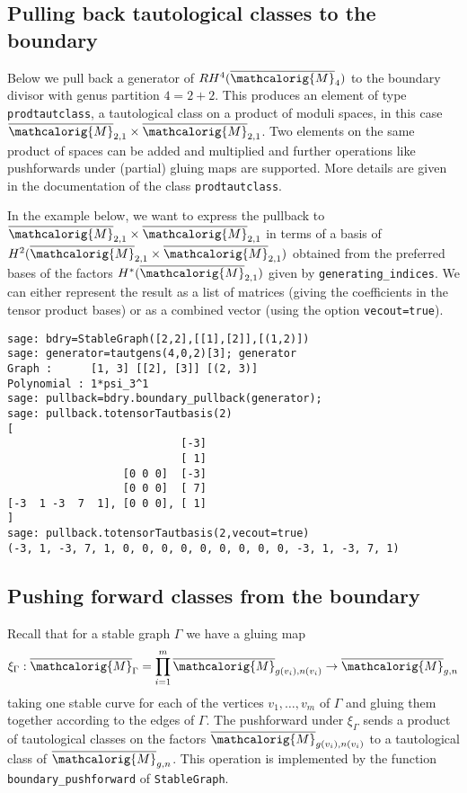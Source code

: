 \documentclass[11pt]{article}
\newcommand{\M}{\ensuremath{\overline{\mathcalorig{M}}}}
\begin{document}
\subsection{Pulling back tautological classes to the boundary} \label{Sect:tautpullback}
Below we pull back a generator of $RH^4(\M_{4})$ to the boundary divisor with genus partition $4=2+2$. This produces an element of type \verb|prodtautclass|, a tautological class on a product of moduli spaces, in this case $\M_{2,1} \times \M_{2,1}$. Two elements on the same product of spaces can be added and multiplied and further operations like pushforwards under (partial) gluing maps are supported. More details are given in the documentation of the class \texttt{prodtautclass}.

In the example below, we want to express the pullback to $\M_{2,1} \times \M_{2,1}$ in terms of a basis of $H^2(\M_{2,1} \times \M_{2,1})$ obtained from the preferred bases of the factors $H^*(\M_{2,1})$ given by \verb|generating_indices|. We can either represent the result as a list of matrices (giving the coefficients in the tensor product bases) or as a combined vector (using the option \verb|vecout=true|).

\begin{lstlisting}
sage: bdry=StableGraph([2,2],[[1],[2]],[(1,2)])
sage: generator=tautgens(4,0,2)[3]; generator
Graph :      [1, 3] [[2], [3]] [(2, 3)]
Polynomial : 1*psi_3^1
sage: pullback=bdry.boundary_pullback(generator);
sage: pullback.totensorTautbasis(2)
[
                           [-3]
                           [ 1]
                  [0 0 0]  [-3]
                  [0 0 0]  [ 7]
[-3  1 -3  7  1], [0 0 0], [ 1]
]
sage: pullback.totensorTautbasis(2,vecout=true)
(-3, 1, -3, 7, 1, 0, 0, 0, 0, 0, 0, 0, 0, 0, -3, 1, -3, 7, 1)
\end{lstlisting}
%
%
\subsection{Pushing forward classes from the boundary} \label{Sect:bdrypushforward}
Recall that for a stable graph $\Gamma$ we have a gluing map
\[\xi_\Gamma : \M_{\Gamma} = \prod_{i=1}^m \M_{g(v_i),n(v_i)} \to \M_{g,n}\]
taking one stable curve for each of the vertices $v_1, \ldots, v_m$ of $\Gamma$ and gluing them together according to the edges of $\Gamma$. The pushforward under $\xi_\Gamma$ sends a product of tautological classes on the factors $\M_{g(v_i),n(v_i)}$ to a tautological class of $\M_{g,n}$. This operation is implemented by the function \verb|boundary_pushforward| of \texttt{StableGraph}.
\end{document}
